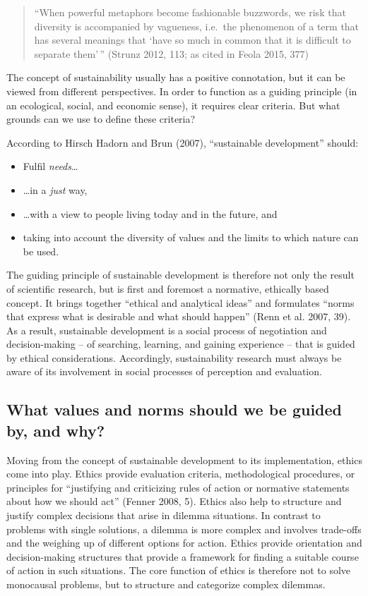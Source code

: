 \documentclass[
  a4paper,
  openany]{book}
\providecommand{\tightlist}{%
  \setlength{\itemsep}{0pt}\setlength{\parskip}{0pt}}
\begin{document}
\begin{quote}
``When powerful metaphors become fashionable buzzwords, we risk that
diversity is accompanied by vagueness, i.e.~the phenomenon of a term
that has several meanings that `have so much in common that it is
difficult to separate them'\,'' (Strunz 2012, 113; as cited in Feola
2015, 377)
\end{quote}

The concept of sustainability usually has a positive connotation, but it
can be viewed from different perspectives. In order to function as a
guiding principle (in an ecological, social, and economic sense), it
requires clear criteria. But what grounds can we use to define these
criteria?

According to Hirsch Hadorn and Brun (2007), ``sustainable development''
should:

\begin{itemize}
\tightlist
\item
  Fulfil \emph{needs}\ldots{}
\item
  \ldots in a \emph{just} way,
\item
  \ldots with a view to people living today and in the future, and
\item
  taking into account the diversity of values and the limits to which
  nature can be used.
\end{itemize}

The guiding principle of sustainable development is therefore not only
the result of scientific research, but is first and foremost a
normative, ethically based concept. It brings together ``ethical and
analytical ideas'' and formulates ``norms that express what is desirable
and what should happen'' (Renn et al. 2007, 39). As a result,
sustainable development is a social process of negotiation and
decision-making -- of searching, learning, and gaining experience --
that is guided by ethical considerations. Accordingly, sustainability
research must always be aware of its involvement in social processes of
perception and evaluation.

\subsection{What values and norms should we be guided by, and
why?}\label{what-values-and-norms-should-we-be-guided-by-and-why}

Moving from the concept of sustainable development to its
implementation, ethics come into play. Ethics provide evaluation
criteria, methodological procedures, or principles for ``justifying and
criticizing rules of action or normative statements about how we should
act'' (Fenner 2008, 5). Ethics also help to structure and justify
complex decisions that arise in dilemma situations. In contrast to
problems with single solutions, a dilemma is more complex and involves
trade-offs and the weighing up of different options for action. Ethics
provide orientation and decision-making structures that provide a
framework for finding a suitable course of action in such situations.
The core function of ethics is therefore not to solve monocausal
problems, but to structure and categorize complex dilemmas.
\end{document}
